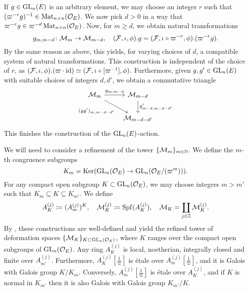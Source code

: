 \documentclass[../main.tex]{subfiles}
\begin{document}
If $g \in \operatorname{GL}_n(E)$ is an arbitrary element, we may choose an integer $r$ such
that $(\varpi^{-r} g)^{-1} \in \operatorname{Mat}_{n \times n}(\mathcal{O}_E)$. We now pick 
$d > 0$ in a way that $\varpi^{-r}g \in \varpi^{-d}\operatorname{Mat}_{n \times n}(\mathcal{O}_E)$. 
Now, for $m \geq d$, we obtain natural transformations
\begin{equation*}
  g_{m,m-d}\colon \mathcal{M}_{m} \to \mathcal{M}_{m-d}, \quad (\mathcal{F}, \iota, \phi).g = (\mathcal{F}, \iota \circ \varpi^{-r}, \phi).(\varpi^{-r}g).
\end{equation*}
By the same reason as above, this yields, for varying choices of $d$, a
compatible system of natural transformations.
This construction is independent of the choice of $r$, as $(\mathcal{F}, \iota,
\phi).(\varpi\cdot\operatorname{id}) \simeq (\mathcal{F}, \iota \circ [\varpi^{-1}], \phi)$.
Furthermore, given $g, g' \in \operatorname{GL}_n(E)$ with suitable choices of integers 
$d, d'$, we obtain a commutative triangle
\begin{equation*}
\begin{tikzcd}[ampersand replacement=\&]
	{\cM_{m}} \& {\cM_{m-d}} \\
	\& {\cM_{m-d-d'}}
	\arrow["{g_{m,m-d}}", from=1-1, to=1-2]
	\arrow["{(gg')_{m,m-d-d'}}"', from=1-1, to=2-2]
	\arrow["{g'_{m-d,m-d-d'}}", from=1-2, to=2-2]
\end{tikzcd}
\end{equation*}
This finishes the construction of the $\operatorname{GL}_n(E)$-action.


We will need to consider a refinement of the tower $\{\mathcal{M}_m\}_{m \in \mathbb{N}}$. We
define the 
$m$-th congruence subgroups
\begin{equation}\label{eq:defCongruenceSubgroup}
  K_m = \operatorname{Ker}(\operatorname{GL}_n(\mathcal{O}_E) \to \operatorname{GL}_n(\mathcal{O}_E/(\varpi^m))).
\end{equation}
For any compact open subgroup $K \subset \operatorname{GL}_n(\mathcal{O}_E)$, we may choose integers
$m > m'$ such that $K_m \subseteq K \subseteq K_{m'}$. We define 
\begin{equation*}
  A_K^{(j)} \coloneq (A^{(j)}_m)^K, \quad \mathcal{M}_K^{(j)} \coloneq \operatorname{Spf}(A_K^{(j)}), \quad
  \mathcal{M}_K = \coprod_{j \in \mathbb{Z}} \mathcal{M}_K^{(j)}.
\end{equation*}
By \cite[Proposition 2.2.5]{Strauch2008DefSp}, these constructions are well-defined
and yield the refined tower of deformation spaces 
$\{\mathcal{M}_K\}_{K \subset \operatorname{GL}_n(\mathcal{O}_E)}$, where $K$ ranges over 
the compact open subgroups of $\operatorname{GL}_n(\mathcal{O}_E)$. Any ring
$A_K^{(j)}$ is local, noetherian, integrally closed and finite over
$A_{m'}^{(j)}$.
Furthermore,
$A_{K}^{(j)}[\tfrac 1 \varpi]$ is \'etale over $A_{m}^{(j)}[\tfrac 1 \varpi]$, 
and it is Galois with Galois group $K/K_m$. Conversely, $A_{m}^{(j)}[\tfrac 1 \varpi]$
is \'etale over $A_K^{(j)}$, and if $K$ is normal in $K_{m'}$ then it is also
Galois with Galois group $K_{m'}/K$. 
\end{document}

